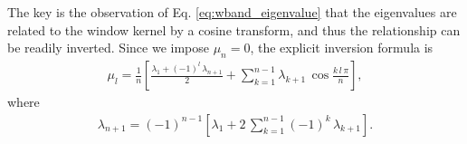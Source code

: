 \documentclass[reprint, floatfix]{revtex4-1}
\begin{document}
The key is the observation of Eq. \eqref{eq:wband_eigenvalue}
that the eigenvalues are related to the window kernel
by a cosine transform,
and thus the relationship can be readily inverted.
%
Since we impose $\mu_n = 0$,
the explicit inversion formula is
%
\begin{align}
  \mu_l
  =
  \frac 1 n
  \left[
    \frac{ \lambda_1 + (-1)^l \, \lambda_{n+1} }
         {               2                     }
    +
    \sum_{ k = 1 }^{ n - 1 }
      \lambda_{ k + 1 } \,
      \cos \frac{ k \, l \, \pi }
                {      n        }
  \right],
  \label{eq:mu_from_lambda}
\end{align}
%
where
%
\begin{align}
  \lambda_{ n + 1 }
  =
  (-1)^{ n - 1 }
  \left[
    \lambda_1
    +
    2 \, \sum_{ k = 1 }^{ n - 1 }
            (-1)^k \, \lambda_{k + 1}
  \right].
  \label{eq:lambdan}
\end{align}
%
\end{document}
